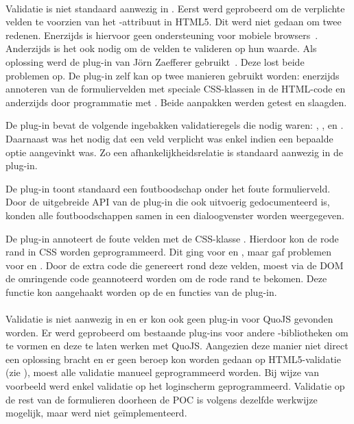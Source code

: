 \paragraph{\jqm}
Validatie is niet standaard aanwezig in \jqm. 
Eerst werd geprobeerd om de verplichte velden te voorzien van het -attribuut in HTML5. 
Dit werd niet gedaan om twee redenen.
Enerzijds is hiervoor geen ondersteuning voor mobiele browsers~\cite{Deveria2013c}. 
Anderzijds is het ook nodig om de velden te valideren op hun waarde.
Als oplossing werd de plug-in van Jörn Zaefferer gebruikt~\cite{Zaefferer2013}. 
Deze lost beide problemen op.
De plug-in zelf kan op twee manieren gebruikt worden: enerzijds annoteren van de formuliervelden met speciale CSS-klassen in de HTML-code en anderzijds door programmatie met \js{}. 
Beide aanpakken werden getest en slaagden. 

De plug-in bevat de volgende ingebakken validatieregels die nodig waren: , ,  en .
Daarnaast was het nodig dat een veld verplicht was enkel indien een bepaalde optie aangevinkt was.
Zo een afhankelijkheidsrelatie is standaard aanwezig in de plug-in.

De plug-in toont standaard een foutboodschap onder het foute formulierveld.
Door de uitgebreide API van de plug-in die ook uitvoerig gedocumenteerd is, konden alle foutboodschappen samen in een dialoogvenster worden weergegeven.

De plug-in annoteert de foute velden met de CSS-klasse .
Hierdoor kon de rode rand in CSS worden geprogrammeerd. 
Dit ging voor  en , maar gaf problemen voor  en .
Door de extra code die \jqm{} genereert rond deze velden, moest via de DOM de omringende code geannoteerd worden om de rode rand te bekomen. 
Deze functie kon aangehaakt worden op de  en  functies van de plug-in.

\paragraph{\lungo}
Validatie is niet aanwezig in \lungo{} en er kon ook geen plug-in voor QuoJS gevonden worden.
Er werd geprobeerd om bestaande plug-ins voor andere \js{}-bibliotheken om te vormen en deze te laten werken met QuoJS.
Aangezien deze manier niet direct een oplossing bracht en er geen beroep kon worden gedaan op HTML5-validatie (zie \jqm{}), moest alle validatie manueel geprogrammeerd worden. 
Bij wijze van voorbeeld werd enkel validatie op het loginscherm geprogrammeerd.
Validatie op de rest van de formulieren doorheen de POC is volgens dezelfde werkwijze mogelijk, maar werd niet geïmplementeerd.

